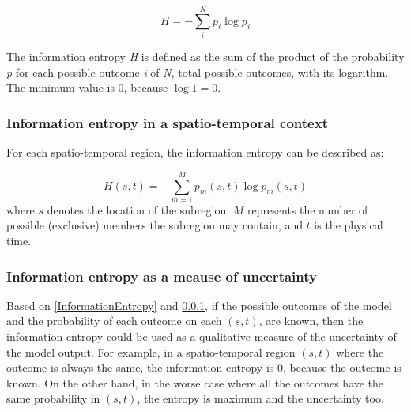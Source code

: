 \begin{equation}
H=-\sum_{i}^N p_{i}\log p_{i}
\end{equation}

The information entropy \textit{H} is defined as the sum of the product of the probability \textit{p} for each possible outcome \textit{i} of \textit{N}, total possible outcomes, with its logarithm. The minimum value is 0, because $\log 1=0$. 

\subsubsection{Information entropy in a spatio-temporal context}
\label{InformationEntropySpatioTemporal}
For each spatio-temporal region, the information entropy can be described as: 

\begin{equation}\label{eq: spatio-temporal Entropy}
H(s,t)=-\sum_{m=1}^M p_{m}(s,t)\log p_{m}(s,t)
\end{equation}
where $s$ denotes the location of the subregion, $M$ represents the number of possible (exclusive) members the subregion may contain, and $t$ is the physical time.

\subsubsection{Information entropy as a meause of uncertainty}\label{subsub:informationentropytomeasuretheuncertainty}
Based on \ref{InformationEntropy} and \ref{InformationEntropySpatioTemporal}, if the possible outcomes of the model and the probability of each outcome on each $(s,t)$, are known, then the information entropy could be used as a qualitative measure of the uncertainty of the model output. For example, in a spatio-temporal region $(s,t)$ where the outcome is always the same, the information entropy is 0, because the outcome is known. On the other hand, in the worse case where all the outcomes have the same probability in $(s,t)$, the entropy is maximum and the uncertainty too.


